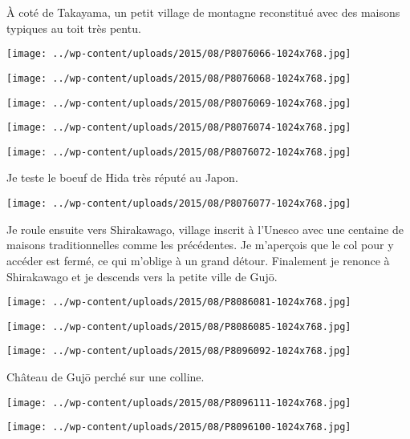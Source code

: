 \pagebreak
 \`A coté de Takayama, un petit village de montagne reconstitué avec des maisons typiques au toit très pentu. 
\begin{center} \texttt{[image: ../wp-content/uploads/2015/08/P8076066-1024x768.jpg]} \end{center}
\begin{center} \texttt{[image: ../wp-content/uploads/2015/08/P8076068-1024x768.jpg]} \end{center}
\begin{center} \texttt{[image: ../wp-content/uploads/2015/08/P8076069-1024x768.jpg]} \end{center}
\begin{center} \texttt{[image: ../wp-content/uploads/2015/08/P8076074-1024x768.jpg]} \end{center}
\begin{center} \texttt{[image: ../wp-content/uploads/2015/08/P8076072-1024x768.jpg]} \end{center}

 Je teste le boeuf de Hida très réputé au Japon. 
\begin{center} \texttt{[image: ../wp-content/uploads/2015/08/P8076077-1024x768.jpg]} \end{center}

\pagebreak
 Je roule ensuite vers Shirakawago, village inscrit à l'Unesco avec une centaine de maisons traditionnelles comme les précédentes. Je m'aperçois que le col pour y accéder est fermé, ce qui m'oblige à un grand détour. Finalement je renonce à Shirakawago et je descends vers la petite ville de Gujō. 
\begin{center} \texttt{[image: ../wp-content/uploads/2015/08/P8086081-1024x768.jpg]} \end{center}
\begin{center} \texttt{[image: ../wp-content/uploads/2015/08/P8086085-1024x768.jpg]} \end{center}
\begin{center} \texttt{[image: ../wp-content/uploads/2015/08/P8096092-1024x768.jpg]} \end{center}

  Château de Gujō perché sur une colline. 
\begin{center} \texttt{[image: ../wp-content/uploads/2015/08/P8096111-1024x768.jpg]} \end{center}
\begin{center} \texttt{[image: ../wp-content/uploads/2015/08/P8096100-1024x768.jpg]} \end{center}

